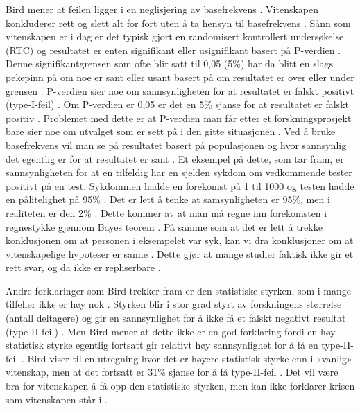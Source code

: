 \documentclass[
]{book}
\begin{document}
Bird mener at feilen ligger i en neglisjering av basefrekvens
\citep{bird2020}. Vitenskapen konkluderer rett og slett alt for fort uten å
ta hensyn til basefrekvens \citep{bird2020}. Sånn som vitenskapen er i dag er
det typisk gjort en randomisert kontrollert undersøkelse (RTC) og
resultatet er enten signifikant eller usignifikant basert på P-verdien
\citep{bird2020}. Denne signifikantgrensen som ofte blir satt til 0,05 (5\%)
har da blitt en slags pekepinn på om noe er sant eller usant basert på
om resultatet er over eller under grensen \citep{bird2020}. P-verdien sier
noe om sannsynligheten for at resultatet er falskt positivt
(type-I-feil) \citep{bird2020}. Om P-verdien er 0,05 er det en 5\% sjanse for
at resultatet er falskt positiv \citep{bird2020}. Problemet med dette er at
P-verdien man får etter et forskningsprosjekt bare sier noe om utvalget
som er sett på i den gitte situasjonen \citep{bird2020}. Ved å bruke
basefrekvens vil man se på resultatet basert på populasjonen og hvor
sannsynlig det egentlig er for at resultatet er sant \citep{bird2020}. Et
eksempel på dette, som \citet{bird2020} tar fram, er sannsynligheten for at en
tilfeldig har en sjelden sykdom om vedkommende tester positivt på en
test. Sykdommen hadde en forekomst på 1 til 1000 og testen hadde en
pålitelighet på 95\% \citep{bird2020}. Det er lett å tenke at samsynligheten
er 95\%, men i realiteten er den 2\% \citep{bird2020}. Dette kommer av at man
må regne inn forekomsten i regnestykke gjennom Bayes teorem \citep{bird2020}.
På samme som at det er lett å trekke konklusjonen om at personen i
eksempelet var syk, kan vi dra konklusjoner om at vitenskapelige
hypoteser er sanne \citep{bird2020}. Dette gjør at mange studier faktisk ikke
gir et rett svar, og da ikke er repliserbare \citep{bird2020}.

Andre forklaringer som Bird trekker fram er den statistiske styrken, som
i mange tilfeller ikke er høy nok \citep{bird2020}. Styrken blir i stor grad
styrt av forskningens størrelse (antall deltagere) og gir en
sannsynlighet for å ikke få et falskt negativt resultat (type-II-feil)
\citep{bird2020}. Men Bird mener at dette ikke er en god forklaring fordi en
høy statistisk styrke egentlig fortsatt gir relativt høy sannsynlighet
for å få en type-II-feil \citep{bird2020}. Bird viser til en utregning hvor
det er høyere statistisk styrke enn i «vanlig» vitenskap, men at det
fortsatt er 31\% sjanse for å få type-II-feil \citep[s. 12-14]{bird2020}. Det
vil være bra for vitenskapen å få opp den statistiske styrken, men kan
ikke forklarer krisen som vitenskapen står i \citep{bird2020}.
\end{document}

